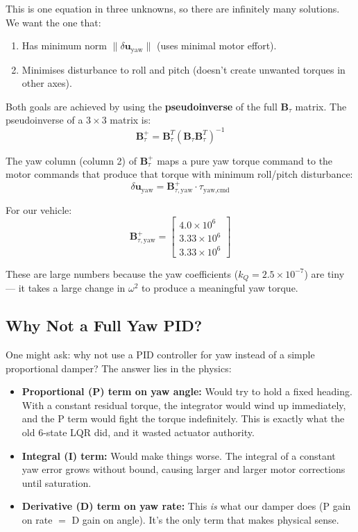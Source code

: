 \documentclass[12pt, a4paper]{article}
\newcommand{\bu}{\bm{u}}
\newcommand{\bB}{\bm{B}}
\begin{document}
This is one equation in three unknowns, so there are infinitely many solutions.  We want the one that:
\begin{enumerate}
    \item Has minimum norm $\|\delta \bu_{\text{yaw}}\|$ (uses minimal motor effort).
    \item Minimises disturbance to roll and pitch (doesn't create unwanted torques in other axes).
\end{enumerate}

Both goals are achieved by using the \textbf{pseudoinverse} of the full $\bB_\tau$ matrix.  The pseudoinverse of a $3 \times 3$ matrix is:
\begin{equation}
    \bB_\tau^+ = \bB_\tau^T \left( \bB_\tau \bB_\tau^T \right)^{-1}
\end{equation}

The yaw column (column 2) of $\bB_\tau^+$ maps a pure yaw torque command to the motor commands that produce that torque with minimum roll/pitch disturbance:
\begin{equation}
    \delta \bu_{\text{yaw}} = \bB_{\tau,\text{yaw}}^{+} \cdot \tau_{\text{yaw,cmd}}
\end{equation}

For our vehicle:
\begin{equation}
    \bB_{\tau,\text{yaw}}^{+} = \begin{bmatrix} 4.0 \times 10^6 \\ 3.33 \times 10^6 \\ 3.33 \times 10^6 \end{bmatrix}
\end{equation}

These are large numbers because the yaw coefficients ($k_Q = 2.5 \times 10^{-7}$) are tiny --- it takes a large change in $\omega^2$ to produce a meaningful yaw torque.

\subsection{Why Not a Full Yaw PID?}

One might ask: why not use a PID controller for yaw instead of a simple proportional damper?  The answer lies in the physics:

\begin{itemize}
    \item \textbf{Proportional (P) term on yaw angle:} Would try to hold a fixed heading.  With a constant residual torque, the integrator would wind up immediately, and the P term would fight the torque indefinitely.  This is exactly what the old 6-state LQR did, and it wasted actuator authority.

    \item \textbf{Integral (I) term:} Would make things worse.  The integral of a constant yaw error grows without bound, causing larger and larger motor corrections until saturation.

    \item \textbf{Derivative (D) term on yaw rate:} This \emph{is} what our damper does (P gain on rate $=$ D gain on angle).  It's the only term that makes physical sense.
\end{itemize}
\end{document}

